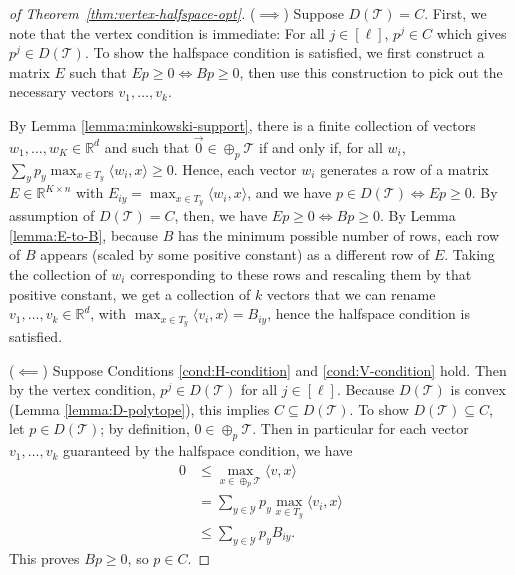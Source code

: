 \documentclass[anon]{colt2020} %
\newcommand{\reals}{\mathbb{R}}
\newcommand{\T}{\mathcal{T}}
\newcommand{\Y}{\mathcal{Y}}
\newcommand{\inprod}[2]{\langle #1, #2 \rangle}%
\begin{document}
\begin{proof}[of Theorem~\ref{thm:vertex-halfspace-opt}]
	($\implies$)
	Suppose $D(\T) = C$.
	First, we note that the vertex condition is immediate: For all $j \in [\ell]$, $p^j \in C$ which gives $p^j \in D(\T)$.
	To show the halfspace condition is satisfied, we first construct a matrix $E$ such that $Ep \geq 0 \iff Bp \geq 0$, then use this construction to pick out the necessary vectors $v_1,\dots,v_k$.
	
	By Lemma \ref{lemma:minkowski-support}, there is a finite collection of vectors $w_1,\dots,w_{K} \in \reals^d$ and such that $\vec 0 \in \oplus_p \T$ if and only if, for all $w_i$, $\sum_y p_y \max_{x \in T_y} \inprod{w_i}{x} \geq 0$.
	Hence, each vector $w_i$ generates a row of a matrix $E \in \reals^{K \times n}$ with $E_{iy} = \max_{x \in T_y} \inprod{w_i}{x}$, and we have $p \in D(\T) \iff Ep \geq 0$.
	By assumption of $D(\T) = C$, then, we have $Ep \geq 0 \iff Bp \geq 0$.
	By Lemma \ref{lemma:E-to-B}, because $B$ has the minimum possible number of rows, each row of $B$ appears (scaled by some positive constant) as a different row of $E$. Taking the collection of $w_i$ corresponding to these rows and rescaling them by that positive constant, we get a collection of $k$ vectors that we can rename $v_1,\ldots,v_k \in \reals^d$, with $\max_{x \in T_y} \inprod{v_i}{x} = B_{iy}$, hence the halfspace condition is satisfied.
	
	($\impliedby$)
	Suppose Conditions \ref{cond:H-condition} and \ref{cond:V-condition} hold.
	Then by the vertex condition, $p^j \in D(\T)$ for all $j \in [\ell]$.
	Because $D(\T)$ is convex (Lemma \ref{lemma:D-polytope}), this implies $C \subseteq D(\T)$.
	To show $D(\T) \subseteq C$, let $p \in D(\T)$; by definition, $0 \in \oplus_p \T$.
	Then in particular for each vector $v_1,\ldots,v_k$ guaranteed by the halfspace condition, we have
	\begin{align*}
	0 &\leq \max_{x \in \oplus_p \T} \inprod{v}{x}  \\
	&=    \sum_{y \in \Y} p_y \max_{x \in T_y} \inprod{v_i}{x}  \\
	&\leq \sum_{y \in \Y} p_y B_{iy} .
	\end{align*}
	This proves $Bp \geq 0$, so $p \in C$.
\end{proof}
\end{document}
